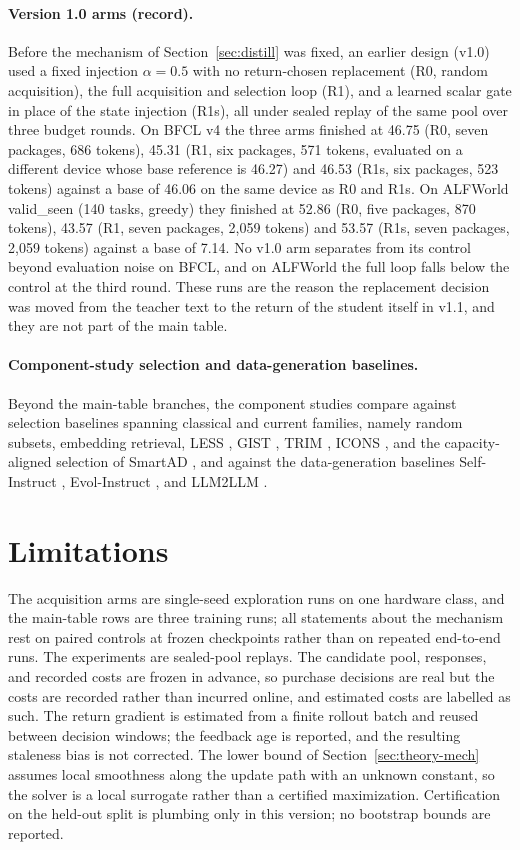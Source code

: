 \paragraph{Version 1.0 arms (record).}
Before the mechanism of Section~\ref{sec:distill} was fixed, an earlier
design (v1.0) used a fixed injection $\alpha=0.5$ with no return-chosen
replacement (R0, random acquisition), the full acquisition and selection
loop (R1), and a learned scalar gate in place of the state injection
(R1s), all under sealed replay of the same pool over three budget
rounds. On BFCL v4 the three arms finished at 46.75 (R0, seven
packages, 686 tokens), 45.31 (R1, six packages, 571 tokens, evaluated
on a different device whose base reference is 46.27) and 46.53 (R1s,
six packages, 523 tokens) against a base of 46.06 on the same device
as R0 and R1s. On ALFWorld valid\_seen (140 tasks, greedy) they
finished at 52.86 (R0, five packages, 870 tokens), 43.57 (R1, seven
packages, 2,059 tokens) and 53.57 (R1s, seven packages, 2,059 tokens)
against a base of 7.14. No v1.0 arm separates from its control beyond
evaluation noise on BFCL, and on ALFWorld the full loop falls below
the control at the third round. These runs are the reason the
replacement decision was moved from the teacher text to the return of
the student itself in v1.1, and they are not part of the main table.

\paragraph{Component-study selection and data-generation baselines.}
Beyond the main-table branches, the component studies compare against
selection baselines spanning classical and current families, namely
random subsets, embedding retrieval, LESS \citep{xia2024less}, GIST
\citep{gist2026}, TRIM \citep{trim2025}, ICONS \citep{icons2025}, and
the capacity-aligned selection of SmartAD \citep{tang2026smartad}, and
against the data-generation baselines Self-Instruct
\citep{wang2023selfinstruct}, Evol-Instruct \citep{xu2024wizardlm},
and LLM2LLM \citep{lee2024llm2llm}.

\section{Limitations}\label{app:limitations}
The acquisition arms are single-seed exploration runs on one hardware
class, and the main-table rows are three training runs; all
statements about the mechanism rest on paired controls at frozen
checkpoints rather than on repeated end-to-end runs. The experiments
are sealed-pool replays. The candidate pool, responses, and recorded
costs are frozen in advance, so purchase decisions are real but the
costs are recorded rather than incurred online, and estimated costs
are labelled as such. The return gradient is estimated from a finite
rollout batch and reused between decision windows; the feedback age
is reported, and the resulting staleness bias is not corrected. The
lower bound of Section~\ref{sec:theory-mech} assumes local smoothness
along the update path with an unknown constant, so the solver is a
local surrogate rather than a certified maximization. Certification on
the held-out split is plumbing only in this version; no bootstrap
bounds are reported.

